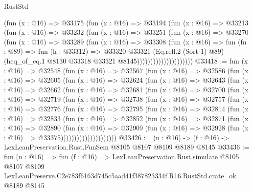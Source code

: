 \begin{lexlean}{RustStd}
\begin{coremodule}
                          (fun (x : @16) =>
                          @33175
                            (fun (x : @16) =>
                            @33194
                              (fun (x : @16) =>
                              @33213
                                (fun (x : @16) =>
                                @33232
                                  (fun (x : @16) =>
                                  @33251
                                    (fun (x : @16) =>
                                    @33270
                                      (fun (x : @16) =>
                                      @33289
                                        (fun (x : @16) =>
                                        @33308
                                          (fun (x : @16) =>
                                          fun (fn : @89) =>
                                          fun (h : @33312) =>
                                          @33320
                                            @33321
                                            (Eq.refl.{2} (Sort 1) @89)
                                            (heq_of_eq.{1}
                                              @8130
                                              @33318
                                              @33321
                                              @8145)))))))))))))))))))))
@33418 := fun (x : @16) =>
  @32548
    (fun (x : @16) =>
    @32567
      (fun (x : @16) =>
      @32586
        (fun (x : @16) =>
        @32605
          (fun (x : @16) =>
          @32624
            (fun (x : @16) =>
            @32643
              (fun (x : @16) =>
              @32662
                (fun (x : @16) =>
                @32681
                  (fun (x : @16) =>
                  @32700
                    (fun (x : @16) =>
                    @32719
                      (fun (x : @16) =>
                      @32738
                        (fun (x : @16) =>
                        @32757
                          (fun (x : @16) =>
                          @32776
                            (fun (x : @16) =>
                            @32795
                              (fun (x : @16) =>
                              @32814
                                (fun (x : @16) =>
                                @32833
                                  (fun (x : @16) =>
                                  @32852
                                    (fun (x : @16) =>
                                    @32871
                                      (fun (x : @16) =>
                                      @32890
                                        (fun (x : @16) =>
                                        @32909
                                          (fun (x : @16) =>
                                          @32928 (fun (x : @16) => @33375)))))))))))))))))))))
@33426 := (n : @16) -> (f : @16) -> LexLeanPreservation.Rust.FunSem @8105 @8107 @8109 @8189 @8145
@33436 := fun (n : @16) =>
  fun (f : @16) =>
  LexLeanPreservation.Rust.simulate
    @8105
    @8107
    @8109
    LexLeanPreserve.C2e783f6163d745c5aad41f387823334f.R16.RustStd.crate_ok
    @8189
    @8145
\end{coremodule}
\end{lexlean}
